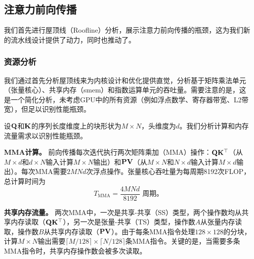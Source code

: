 \subsection{注意力前向传播}
\label{sec:fwd}

我们首先进行屋顶线（Roofline）分析，展示注意力前向传播的瓶颈，这为我们新的流水线设计提供了动力，同时也推动了。

\subsubsection{资源分析}
\label{sec:fwd-feeds-and-speeds}

我们通过首先分析屋顶线来为内核设计和优化提供直觉，分析基于矩阵乘法单元（张量核心）、共享内存（smem）和指数运算单元的吞吐量。需要注意的是，这是一个简化分析，未考虑GPU中的所有资源（例如浮点数学、寄存器带宽、L2带宽），但足以识别性能瓶颈。

设$\mathbf{Q}$和$\mathbf{K}$的序列长度维度上的块形状为$M \times N$，头维度为$d$。我们分析计算和内存流量需求以识别性能瓶颈。

\noindent\textbf{MMA计算。}
前向传播每次迭代执行两次矩阵乘加（MMA）操作：$\mathbf{Q}\mathbf{K}^\top$（从$M \times d$和$d \times N$输入计算$M \times N$输出）和$\mathbf{P}\mathbf{V}$（从$M \times N$和$N \times d$输入计算$M \times d$输出）。每次MMA需要$2MNd$次浮点操作。张量核心吞吐量为每周期8192次FLOP，总计算时间为
{\setlength{\abovedisplayskip}{4pt}%
 \setlength{\belowdisplayskip}{4pt}%
 \setlength{\abovedisplayshortskip}{3pt}%
 \setlength{\belowdisplayshortskip}{3pt}%
\begin{equation}
    T_{\text{MMA}} = \frac{4MNd}{8192} \text{ 周期。}
\end{equation}}

\noindent\textbf{共享内存流量。}
两次MMA中，一次是共享-共享（SS）类型，两个操作数均从共享内存读取（$\mathbf{Q}\mathbf{K}^\top$），另一次是张量-共享（TS）类型，操作数$A$从张量内存读取，操作数$B$从共享内存读取（$\mathbf{P}\mathbf{V}$）。由于每条MMA指令处理$128 \times 128$的分块，计算$M \times N$输出需要$\lceil M/128 \rceil \times \lceil N/128 \rceil$条MMA指令。关键的是，当需要多条MMA指令时，共享内存操作数会被多次读取。

